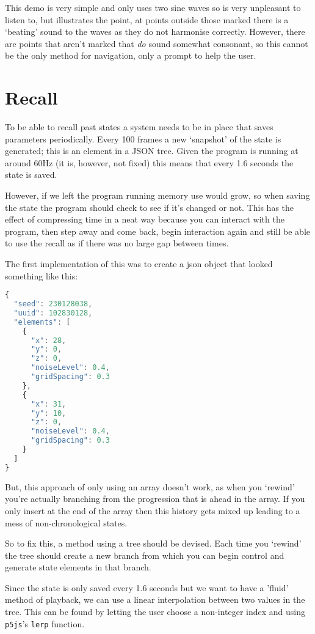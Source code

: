 This demo is very simple and only uses two sine waves so is very unpleasant to
listen to, but illustrates the point, at points outside those marked there is a
`beating' sound to the waves as they do not harmonise correctly. However, there
are points that aren't marked that \emph{do} sound somewhat consonant, so this
cannot be the only method for navigation, only a prompt to help the user.
\section{Recall}
To be able to recall past states a system needs to be in place that saves
parameters periodically. Every 100 frames a new `snapshot' of the state is
generated; this is an element in a JSON tree. Given the program is running at
around 60Hz (it is, however, not fixed) this means that every 1.6 seconds the
state is saved.

However, if we left the program running memory use would grow, so when saving
the state the program should check to see if it's changed or not. This has the
effect of compressing time in a neat way because you can interact with the
program, then step away and come back, begin interaction again and still be able
to use the recall as if there was no large gap between times.

The first implementation of this was to create a json object that looked
something like this:

\begin{lstlisting}[language=javascript]
{
  "seed": 230128038,
  "uuid": 102830128,
  "elements": [
    {
      "x": 28,
      "y": 0,
      "z": 0,
      "noiseLevel": 0.4,
      "gridSpacing": 0.3
    },
    {
      "x": 31,
      "y": 10,
      "z": 0,
      "noiseLevel": 0.4,
      "gridSpacing": 0.3
    }
  ]
}
\end{lstlisting}

But, this approach of only using an array doesn't work, as when you `rewind'
you're actually branching from the progression that is ahead in the array. If
you only insert at the end of the array then this history gets mixed up leading
to a mess of non-chronological states.

So to fix this, a method using a tree should be devised. Each time you `rewind'
the tree should create a new branch from which you can begin control and
generate state elements in that branch.


Since the state is only saved every 1.6 seconds but we want to have a 'fluid'
method of playback, we can use a linear interpolation between two values in the
tree. This can be found by letting the user choose a non-integer index and using
\verb|p5js|'s \verb|lerp| function.

